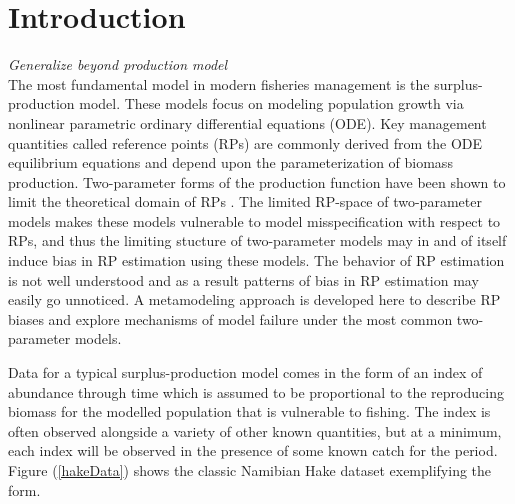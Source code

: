 \documentclass[12pt]{ucscthesis}
\begin{document}

%
\linenumbers

%
\chapter{\color{blue}Introduction \label{intro}}
\clearpage

{\color{blue} {\it Generalize beyond production model}\\

The most fundamental model in modern fisheries management is the surplus-production
model. These models focus on modeling population growth via nonlinear
parametric ordinary differential equations (ODE). Key management quantities
called reference points (RPs) are commonly derived from the ODE equilibrium
equations and depend upon the parameterization of biomass production.
Two-parameter forms of the production function have been shown to
limit the theoretical domain of RPs \cite{mangel_perspective_2013}.
The limited RP-space of two-parameter models makes these models vulnerable to
model misspecification with respect to RPs, and thus the limiting stucture of
two-parameter models may in and of itself induce bias in RP estimation using
these models. The behavior of RP estimation is not well understood and as a
result patterns of bias in RP estimation may easily go unnoticed. A
metamodeling approach is developed here to describe RP biases and explore
mechanisms of model failure under the most common two-parameter models. %

Data for a typical surplus-production model comes in the form of an index
of abundance through time which is assumed to be proportional to the reproducing
biomass for the modelled population that is vulnerable to fishing. The index
is often observed alongside a variety of other known quantities, but at a
minimum, each index will be observed in the presence of some known catch for
the period. Figure (\ref{hakeData}) shows the classic Namibian Hake dataset
\cite{punt_model_1988, hilborn_ecological_1997, mangel_theoretical_2006}
exemplifying the form.

}
\end{document}
